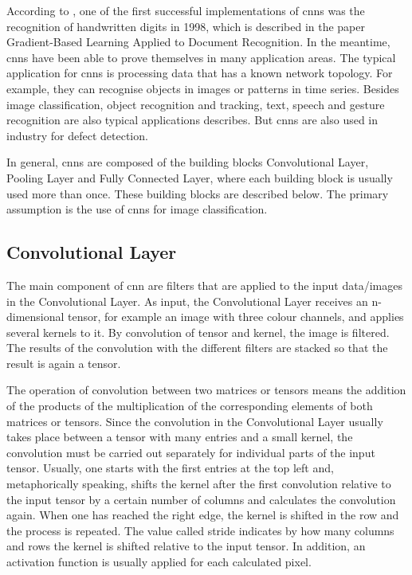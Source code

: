 According to \cite{Sharma:2018}, one of the first successful implementations of \ac{cnn}s was the recognition of handwritten digits in 1998, which is described in the paper \glqq Gradient-Based Learning Applied to Document Recognition\grqq \cite{LeCun:1998}. In the meantime, \ac{cnn}s have been able to prove themselves in many application areas. The typical application for \ac{cnn}s is processing data that has a known network topology. For example, they can recognise objects in images or patterns in time series. \cite{Namatevs.2017} Besides image classification, object recognition and tracking, text, speech and gesture recognition are also typical applications \cite{Gu:2018} describes. But \ac{cnn}s are also used in industry for defect detection. \cite{LopezdeLacalle:2020}

In general, \ac{cnn}s are composed of the building blocks Convolutional Layer, Pooling Layer and Fully Connected Layer, where each building block is usually used more than once. These building blocks are described below. The primary assumption is the use of \ac{cnn}s for image classification.

\subsection{Convolutional Layer}

The main component of \ac{cnn} are filters that are applied to the input data/images in the Convolutional Layer. As input, the Convolutional Layer receives an n-dimensional tensor, for example an image with three colour channels, and applies several kernels to it. By convolution of tensor and kernel, the image is filtered. The results of the convolution with the different filters are stacked so that the result is again a tensor. \cite{Michelucci:2019}

The operation of convolution between two matrices or tensors means the addition of the products of the multiplication of the corresponding elements of both matrices or tensors. Since the convolution in the Convolutional Layer usually takes place between a tensor with many entries and a small kernel, the convolution must be carried out separately for individual parts of the input tensor. Usually, one starts with the first entries at the top left and, metaphorically speaking, shifts the kernel after the first convolution relative to the input tensor by a certain number of columns and calculates the convolution again. When one has reached the right edge, the kernel is shifted in the row and the process is repeated. The value called stride indicates by how many columns and rows the kernel is shifted relative to the input tensor. In addition, an activation function is usually applied for each calculated pixel. \cite{Michelucci:2019}

